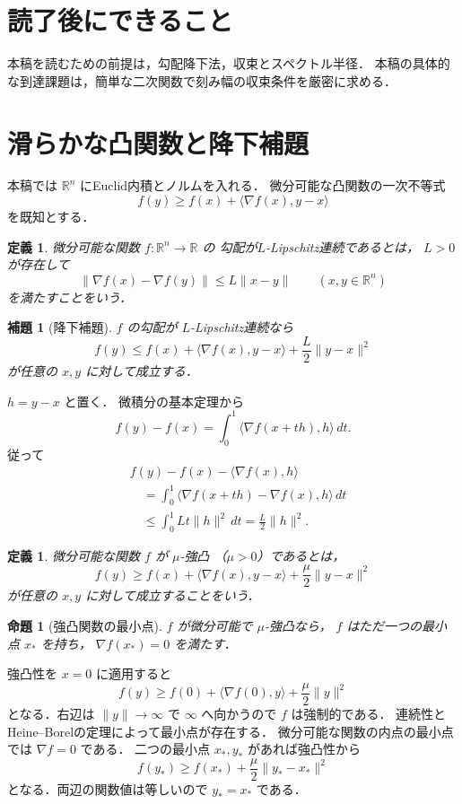 \documentclass[a5paper,10pt,onecolumn]{jsarticle}
\makeatletter
\theoremstyle{mathnotetheorem}
\newtheorem{definition}[theorem]{定義}
\newtheorem{lemma}[theorem]{補題}
\newtheorem{proposition}[theorem]{命題}
\renewcommand{\proofname}{証明}
\renewenvironment{proof}[1][\proofname]{%
  \par\pushQED{\qed}\normalfont\topsep4\p@\@plus2\p@\relax
  \trivlist\item[\hskip\labelsep\bfseries #1]\ignorespaces
}{\popQED\endtrivlist\@endpefalse}
\newcommand{\norm}[1]{\lVert #1\rVert}
\makeatother
\begin{document}
\section*{読了後にできること}
本稿を読むための前提は，勾配降下法，収束とスペクトル半径．
本稿の具体的な到達課題は，簡単な二次関数で刻み幅の収束条件を厳密に求める．


\section{滑らかな凸関数と降下補題}

本稿では $\mathbb R^n$ にEuclid内積とノルムを入れる．
微分可能な凸関数の一次不等式
\[
 f(y)\ge f(x)+\langle\nabla f(x),y-x\rangle
\]
を既知とする．

\begin{definition}
微分可能な関数 $f:\mathbb R^n\to\mathbb R$ の
勾配が\emph{$L$-Lipschitz連続}であるとは，
$L>0$ が存在して
\[
 \norm{\nabla f(x)-\nabla f(y)}
 \le L\norm{x-y}\qquad(x,y\in\mathbb R^n)
\]
を満たすことをいう．
\end{definition}

\begin{lemma}[降下補題]\label{lem:descent}
$f$ の勾配が $L$-Lipschitz連続なら
\[
 f(y)\le f(x)+\langle\nabla f(x),y-x\rangle
       +\frac L2\norm{y-x}^2
\]
が任意の $x,y$ に対して成立する．
\end{lemma}
\begin{proof}
$h=y-x$ と置く．
微積分の基本定理から
\[
 f(y)-f(x)
 =\int_0^1\langle\nabla f(x+th),h\rangle\,dt.
\]
従って
\begin{align*}
 &f(y)-f(x)-\langle\nabla f(x),h\rangle\\
 &\quad=\int_0^1
 \langle\nabla f(x+th)-\nabla f(x),h\rangle\,dt\\
 &\quad\le\int_0^1Lt\norm h^2\,dt
 =\frac L2\norm h^2.
\end{align*}
\end{proof}

\begin{definition}
微分可能な関数 $f$ が $\mu$-\emph{強凸}
（$\mu>0$）であるとは，
\[
 f(y)\ge f(x)+\langle\nabla f(x),y-x\rangle
 +\frac\mu2\norm{y-x}^2
\]
が任意の $x,y$ に対して成立することをいう．
\end{definition}

\begin{proposition}[強凸関数の最小点]\label{prop:strong-min}
$f$ が微分可能で $\mu$-強凸なら，
$f$ はただ一つの最小点 $x_*$ を持ち，
$\nabla f(x_*)=0$ を満たす．
\end{proposition}
\begin{proof}
強凸性を $x=0$ に適用すると
\[
 f(y)\ge f(0)+\langle\nabla f(0),y\rangle
 +\frac\mu2\norm y^2
\]
となる．右辺は $\norm y\to\infty$ で
$\infty$ へ向かうので $f$ は強制的である．
連続性とHeine--Borelの定理によって最小点が存在する．
微分可能な関数の内点の最小点では $\nabla f=0$ である．
二つの最小点 $x_*,y_*$ があれば強凸性から
\[
 f(y_*)\ge f(x_*)+\frac\mu2\norm{y_*-x_*}^2
\]
となる．両辺の関数値は等しいので $y_*=x_*$ である．
\end{proof}
\end{document}
